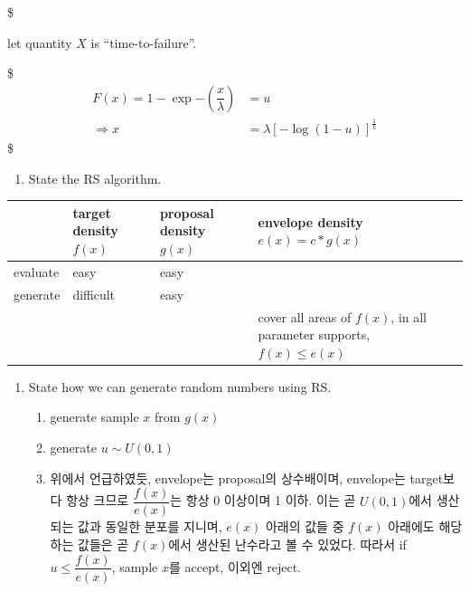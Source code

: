 \documentclass[
]{book}
\providecommand{\tightlist}{%
  \setlength{\itemsep}{0pt}\setlength{\parskip}{0pt}}
\begin{document}
\$

let quantity \(X\) is ``time-to-failure''.

\$
\begin{align}
F(x) = 1- \exp{- \left( \dfrac{x}{\lambda} \right) } &= u \\
\Longrightarrow x &= \lambda \left[ -\log (1-u) \right]^{\tfrac{1}{k}}

\end{align}
\$

\begin{enumerate}
\def\labelenumi{\arabic{enumi}.}
\setcounter{enumi}{1}
\tightlist
\item
  State the RS algorithm.
\end{enumerate}

\begin{longtable}[]{@{}
  >{\centering\arraybackslash}p{}
  >{\centering\arraybackslash}p{}
  >{\centering\arraybackslash}p{}
  >{\centering\arraybackslash}p{}@{}}
\toprule
& target density \(f(x)\) & proposal density \(g(x)\) & envelope density \(e(x) = c \ast g(x)\) \\
\midrule
\endhead
evaluate & easy & easy & \\
generate & difficult & easy & \\
& & & cover all areas of \(f(x)\), in all parameter supports, \(f(x) \le e(x)\) \\
\bottomrule
\end{longtable}

\begin{enumerate}
\def\labelenumi{\arabic{enumi}.}
\setcounter{enumi}{2}
\tightlist
\item
  State how we can generate random numbers using RS.

  \begin{enumerate}
  \def\labelenumii{\arabic{enumii}.}
  \tightlist
  \item
    generate sample \(x\) from \(g(x)\)
  \item
    generate \(u \sim U(0,1)\)
  \item
    위에서 언급하였듯, envelope는 proposal의 상수배이며, envelope는 target보다 항상 크므로 \(\dfrac{f(x)}{e(x)}\)는 항상 0 이상이며 1 이하. 이는 곧 \(U(0,1)\)에서 생산되는 값과 동일한 분포를 지니며, \(e(x)\) 아래의 값들 중 \(f(x)\) 아래에도 해당하는 값들은 곧 \(f(x)\)에서 생산된 난수라고 볼 수 있었다. 따라서 if \(u \le \dfrac{f(x)}{e(x)}\), sample \(x\)를 accept, 이외엔 reject.
  \end{enumerate}
\end{enumerate}
\end{document}
